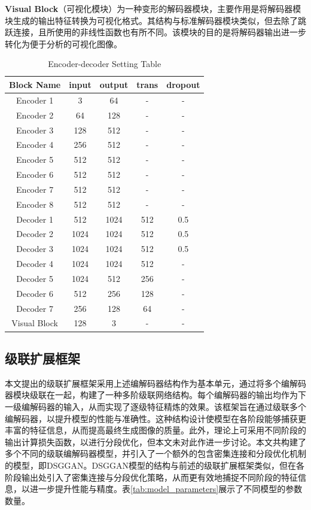 \documentclass[twocolumn]{article}
\begin{document}
\textbf{Visual Block}（可视化模块）为一种变形的解码器模块，主要作用是将解码器模块生成的输出特征转换为可视化格式。其结构与标准解码器模块类似，但去除了跳跃连接，且所使用的非线性函数也有所不同。该模块的目的是将解码器输出进一步转化为便于分析的可视化图像。

\begin{table}[h]
	\caption{Encoder-decoder Setting Table}
	\label{tab:encoder_setting}
	\begin{tabular}{ccccc}
		\hline
		Block Name   & input & output & trans & dropout \\
		\hline
		Encoder 1    & 3     & 64     & -     & -       \\
		Encoder 2    & 64    & 128    & -     & -       \\
		Encoder 3    & 128   & 512    & -     & -       \\
		Encoder 4    & 256   & 512    & -     & -       \\
		Encoder 5    & 512   & 512    & -     & -       \\
		Encoder 6    & 512   & 512    & -     & -       \\
		Encoder 7    & 512   & 512    & -     & -       \\
		Encoder 8    & 512   & 512    & -     & -       \\
		Decoder 1    & 512   & 1024   & 512   & 0.5     \\
		Decoder 2    & 1024  & 1024   & 512   & 0.5     \\
		Decoder 3    & 1024  & 1024   & 512   & 0.5     \\
		Decoder 4    & 1024  & 1024   & 512   & -       \\
		Decoder 5    & 1024  & 512    & 256   & -       \\
		Decoder 6    & 512   & 256    & 128   & -       \\
		Decoder 7    & 256   & 128    & 64    & -       \\
		Visual Block & 128   & 3      & -     & -       \\
		\hline
	\end{tabular}
\end{table}

\subsection{级联扩展框架}
本文提出的级联扩展框架采用上述编解码器结构作为基本单元，通过将多个编解码器模块级联在一起，构建了一种多阶级联网络结构。每个编解码器的输出均作为下一级编解码器的输入，从而实现了逐级特征精炼的效果。该框架旨在通过级联多个编解码器，以提升模型的性能与准确性。这种结构设计使模型在各阶段能够捕获更丰富的特征信息，从而提高最终生成图像的质量。此外，理论上可采用不同阶段的输出计算损失函数，以进行分段优化，但本文未对此作进一步讨论。本文共构建了多个不同的级联编解码器模型，并引入了一个额外的包含密集连接和分段优化机制的模型，即DSGGAN。DSGGAN模型的结构与前述的级联扩展框架类似，但在各阶段输出处引入了密集连接与分段优化策略，从而更有效地捕捉不同阶段的特征信息，以进一步提升性能与精度。表\ref{tab:model_parameters}展示了不同模型的参数数量。
\end{document}
